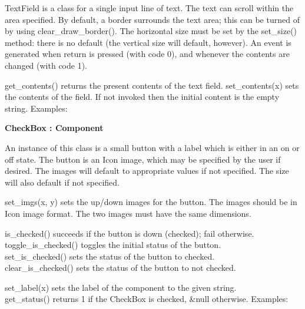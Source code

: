 TextField is a class for a single input line of text. The text can
scroll within the area specified. By default, a border surrounds the
text area; this can be turned of by using clear\_draw\_border(). The
horizontal size must be set by the set\_size() method: there is no
default (the vertical size will default, however). An event is
generated when return is pressed (with code 0), and whenever the
contents are changed (with code 1).

get\_contents() returns the present contents of the text field.
set\_contents(x) sets the contents of the field. If not invoked then
the initial content is the empty string. Examples:


{\sffamily\bfseries
{}CheckBox : Component}

An instance of this class is a small button with a label which is either
in an on or off state. The button is an Icon image, which may be
specified by the user if desired. The images will default to
appropriate values if not specified. The size will also default if not
specified.

set\_imgs(x, y) sets the up/down images for the button. The images
should be in Icon image format. The two images must have the same
dimensions.

is\_checked() succeeds if the button is down (checked); fail
otherwise.\\
toggle\_is\_checked() toggles the initial status of the button.\\
set\_is\_checked() sets the status of the button to checked.\\
clear\_is\_checked() sets the status of the button to not checked.

set\_label(x) sets the label of the component to the given
string.\\
get\_status() returns 1 if the CheckBox is checked, \&null otherwise.
Examples:


